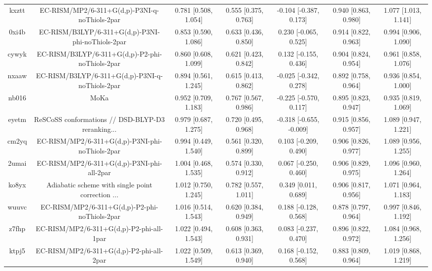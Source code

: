 \documentclass{article}
\begin{document}
\begin{center}
\begin{longtable}{|ccccccc|}
 kxztt &      EC-RISM/MP2/6-311+G(d,p)-P3NI-q-noThiols-2par &  0.781 [0.508, 1.054] &  0.555 [0.375, 0.763] &   -0.104 [-0.387, 0.173] &  0.940 [0.863, 0.980] &   1.077 [1.013, 1.141] \\
 0xi4b &  EC-RISM/B3LYP/6-311+G(d,p)-P3NI-phi-noThiols-2par &  0.853 [0.590, 1.086] &  0.633 [0.436, 0.850] &    0.230 [-0.065, 0.525] &  0.914 [0.822, 0.963] &   0.994 [0.906, 1.090] \\
 cywyk &    EC-RISM/B3LYP/6-311+G(d,p)-P2-phi-noThiols-2par &  0.860 [0.608, 1.099] &  0.621 [0.423, 0.842] &    0.132 [-0.155, 0.436] &  0.904 [0.824, 0.954] &   0.961 [0.858, 1.076] \\
 nxaaw &    EC-RISM/B3LYP/6-311+G(d,p)-P3NI-q-noThiols-2par &  0.894 [0.561, 1.245] &  0.615 [0.413, 0.862] &   -0.025 [-0.342, 0.278] &  0.892 [0.758, 0.964] &   0.936 [0.854, 1.000] \\
 nb016 &                                               MoKa &  0.952 [0.709, 1.183] &  0.767 [0.567, 0.986] &   -0.225 [-0.570, 0.117] &  0.895 [0.823, 0.947] &   0.935 [0.819, 1.069] \\
 eyetm &  ReSCoSS conformations // DSD-BLYP-D3 reranking... &  0.979 [0.687, 1.275] &  0.720 [0.495, 0.968] &  -0.318 [-0.655, -0.009] &  0.915 [0.856, 0.957] &   1.089 [0.947, 1.221] \\
 cm2yq &    EC-RISM/MP2/6-311+G(d,p)-P3NI-phi-noThiols-2par &  0.994 [0.449, 1.540] &  0.561 [0.320, 0.899] &    0.103 [-0.209, 0.490] &  0.906 [0.826, 0.977] &   1.089 [0.956, 1.255] \\
 2umai &         EC-RISM/MP2/6-311+G(d,p)-P3NI-phi-all-2par &  1.004 [0.468, 1.535] &  0.574 [0.330, 0.912] &    0.067 [-0.250, 0.460] &  0.906 [0.829, 0.975] &   1.096 [0.960, 1.264] \\
 ko8yx &  Adiabatic scheme with single point correction ... &  1.012 [0.750, 1.245] &  0.782 [0.557, 1.011] &     0.349 [0.011, 0.689] &  0.906 [0.817, 0.956] &   1.071 [0.964, 1.183] \\
 wuuvc &      EC-RISM/MP2/6-311+G(d,p)-P2-phi-noThiols-2par &  1.016 [0.514, 1.543] &  0.620 [0.384, 0.949] &    0.188 [-0.128, 0.568] &  0.878 [0.797, 0.964] &   0.997 [0.846, 1.192] \\
 z7fhp &           EC-RISM/MP2/6-311+G(d,p)-P2-phi-all-1par &  1.022 [0.494, 1.543] &  0.608 [0.363, 0.931] &    0.083 [-0.237, 0.470] &  0.896 [0.822, 0.972] &   1.084 [0.968, 1.256] \\
 ktpj5 &           EC-RISM/MP2/6-311+G(d,p)-P2-phi-all-2par &  1.022 [0.509, 1.549] &  0.613 [0.369, 0.940] &    0.168 [-0.152, 0.568] &  0.883 [0.809, 0.964] &   1.019 [0.868, 1.219] \\

\end{longtable}
\end{center}
\end{document}
